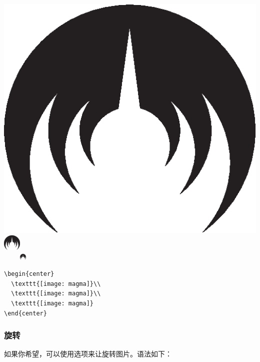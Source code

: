 \begin{codelist}[]{
    \begin{center} 
    \includegraphics[scale=0.2]{img/magma}\\
    \includegraphics[width=8.5mm]{img/magma}\\
    \includegraphics[width=2cm,
                    height=3mm]{img/magma}
    \end{center}
}\begin{verbatim}
\begin{center}
  \texttt{[image: magma]}\\
  \texttt{[image: magma]}\\
  \texttt{[image: magma]}
\end{center}
\end{verbatim}
\end{codelist}

\subsubsection{旋转}

如果你希望，可以使用选项来让旋转图片。语法如下：

